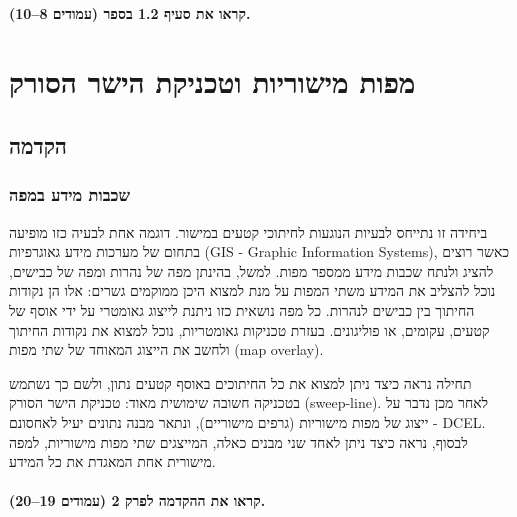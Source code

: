 \documentclass[
]{book}
\begin{document}
\hypertarget{ux5e7ux5e8ux5d0ux5d5-ux5d0ux5ea-ux5e1ux5e2ux5d9ux5e3-1.2-ux5d1ux5e1ux5e4ux5e8-ux5e2ux5deux5d5ux5d3ux5d9ux5dd-810.}{%
\subsubsection*{קראו את סעיף 1.2 בספר (עמודים 8--10).}\label{ux5e7ux5e8ux5d0ux5d5-ux5d0ux5ea-ux5e1ux5e2ux5d9ux5e3-1.2-ux5d1ux5e1ux5e4ux5e8-ux5e2ux5deux5d5ux5d3ux5d9ux5dd-810.}}

\hypertarget{map-overlay}{%
\chapter{מפות מישוריות וטכניקת הישר הסורק}\label{map-overlay}}

\hypertarget{preface}{%
\section{הקדמה}\label{preface}}

\hypertarget{them-map}{%
\subsection{שכבות מידע במפה}\label{them-map}}

ביחידה זו נתייחס לבעיות הנוגעות לחיתוכי קטעים במישור. דוגמה אחת לבעיה
כזו מופיעה בתחום של מערכות מידע גאוגרפיות (GIS - Graphic Information
Systems), כאשר רוצים להציג ולנתח שכבות מידע ממספר מפות. למשל, בהינתן מפה
של נהרות ומפה של כבישים, נוכל להצליב את המידע משתי המפות על מנת למצוא
היכן ממוקמים גשרים: אלו הן נקודות החיתוך בין כבישים לנהרות. כל מפה
נושאית כזו ניתנת לייצוג גאומטרי על ידי אוסף של קטעים, עקומים, או
פוליגונים. בעזרת טכניקות גאומטריות, נוכל למצוא את נקודות החיתוך ולחשב את
הייצוג המאוחד של שתי מפות (map overlay).

תחילה נראה כיצד ניתן למצוא את כל החיתוכים באוסף קטעים נתון, ולשם כך
נשתמש בטכניקה חשובה שימושית מאוד: טכניקת הישר הסורק (sweep-line). לאחר
מכן נדבר על ייצוג של מפות מישוריות (גרפים מישוריים), ונתאר מבנה נתונים
יעיל לאחסונם - DCEL. לבסוף, נראה כיצד ניתן לאחד שני מבנים כאלה, המייצגים
שתי מפות מישוריות, למפה מישורית אחת המאגדת את כל המידע.

\hypertarget{ux5e7ux5e8ux5d0ux5d5-ux5d0ux5ea-ux5d4ux5d4ux5e7ux5d3ux5deux5d4-ux5dcux5e4ux5e8ux5e7-2-ux5e2ux5deux5d5ux5d3ux5d9ux5dd-1920.}{%
\subsubsection*{קראו את ההקדמה לפרק 2 (עמודים 19--20).}\label{ux5e7ux5e8ux5d0ux5d5-ux5d0ux5ea-ux5d4ux5d4ux5e7ux5d3ux5deux5d4-ux5dcux5e4ux5e8ux5e7-2-ux5e2ux5deux5d5ux5d3ux5d9ux5dd-1920.}}
\end{document}

